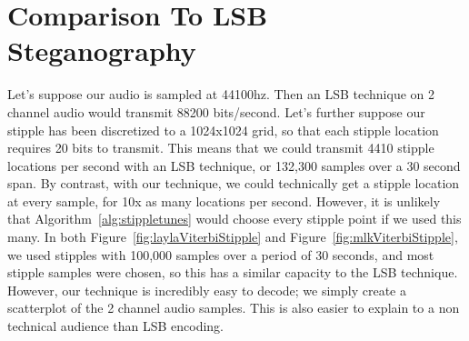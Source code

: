 \documentclass{article}
\begin{document}
\section{Comparison To LSB Steganography}
Let's suppose our audio is sampled at 44100hz.  Then an LSB technique on 2 channel audio would transmit 88200 bits/second.  Let's further suppose our stipple has been discretized to a 1024x1024 grid, so that each stipple location requires 20 bits to transmit.  This means that we could transmit 4410 stipple locations per second with an LSB technique, or 132,300 samples over a 30 second span.  By contrast, with our technique, we could technically get a stipple location at every sample, for 10x as many locations per second.  However, it is unlikely that Algorithm~\ref{alg:stippletunes} would choose every stipple point if we used this many.  In both Figure~\ref{fig:laylaViterbiStipple} and Figure~\ref{fig:mlkViterbiStipple}, we used stipples with 100,000 samples over a period of 30 seconds, and most stipple samples were chosen, so this has a similar capacity to the LSB technique.  However, our technique is incredibly easy to decode; we simply create a scatterplot of the 2 channel audio samples.  This is also easier to explain to a non technical audience than LSB encoding.







\end{document}
